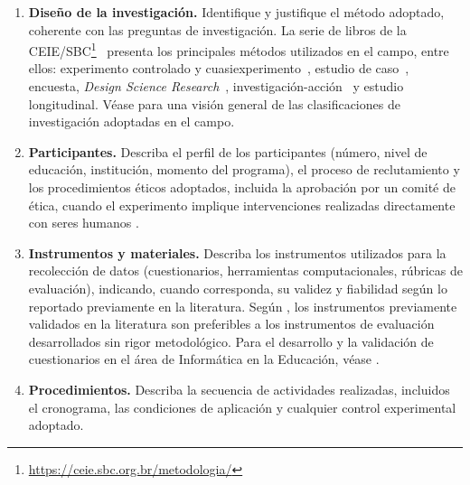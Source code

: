 \documentclass[spanish]{rbie2026}%
\begin{document}
\begin{enumerate}
  \item \textbf{Diseño de la investigación.} Identifique y justifique el método adoptado, coherente con las preguntas de investigación. La serie de libros de la CEIE/SBC\footnote{\url{https://ceie.sbc.org.br/metodologia/}}~\citep{mpcie_vol1_concepcao_pesquisa, mpcie_vol2_pesquisa_quanti, mpcie_vol3_pesquisa_quali} presenta los principales métodos utilizados en el campo, entre ellos: experimento controlado y cuasiexperimento~\citep{mpcie_vol2_cap2_experimentos}, estudio de caso~\citep{mpcie_vol3_cap1_estudo_caso}, encuesta, \textit{Design Science Research}~\citep{mpcie_vol1_cap5_design_science_research}, investigación-acción~\citep{mpcie_vol3_cap2_pesquisa_acao} y estudio longitudinal. Véase \citep{mpcie_vol1_cap4_tipos_pesquisa} para una visión general de las clasificaciones de investigación adoptadas en el campo.

  \item \textbf{Participantes.} Describa el perfil de los participantes (número, nivel de educación, institución, momento del programa), el proceso de reclutamiento y los procedimientos éticos adoptados, incluida la aprobación por un comité de ética, cuando el experimento implique intervenciones realizadas directamente con seres humanos \citep{mpcie_vol1_cap7_etica}.

  \item \textbf{Instrumentos y materiales.} Describa los instrumentos utilizados para la recolección de datos (cuestionarios, herramientas computacionales, rúbricas de evaluación), indicando, cuando corresponda, su validez y fiabilidad según lo reportado previamente en la literatura. Según \cite{Bittencourt_Isotani_2018_Evidencias}, los instrumentos previamente validados en la literatura son preferibles a los instrumentos de evaluación desarrollados sin rigor metodológico. Para el desarrollo y la validación de cuestionarios en el área de Informática en la Educación, véase \cite{mpcie_vol2_cap6_questionarios}.

  \item \textbf{Procedimientos.} Describa la secuencia de actividades realizadas, incluidos el cronograma, las condiciones de aplicación y cualquier control experimental adoptado.


\end{enumerate}
\end{document}
